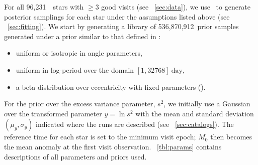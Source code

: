 \documentclass[modern, letterpaper]{aastex62}
\newcommand{\apogee}{\project{\acronym{APOGEE}}}
\newcommand{\thejoker}{\project{The~Joker}}
\newcommand{\nprior}{536,870,912}
\newcommand{\nstars}{96,231}
\begin{document}
For all \nstars\ \apogee\ stars with $\geq 3$ good visits (see
\sectionname~\ref{sec:data}), we use \thejoker\ to generate posterior samplings
for each star under the assumptions listed above (see
\sectionname~\ref{sec:fitting}).
We start by generating a library of \nprior\ prior samples generated under a
prior similar to that defined in \citet{Price-Whelan:2017}:
\begin{itemize}
    \item uniform or isotropic in angle parameters,
    \item uniform in log-period over the domain $[1,32768]~\textrm{day}$,
    \item a beta distribution over eccentricity with fixed parameters (\citealt{Kipping:2013}).
\end{itemize}
For the prior over the excess variance parameter, $s^2$, we initially use
a Gaussian over the transformed parameter $y = \ln s^2$ with the mean and
standard deviation $(\mu_y, \sigma_y)$ indicated where the runs are described
(see \sectionname~\ref{sec:catalogs}).
The reference time for each star is set to the minimum visit epoch; $M_0$ then
becomes the mean anomaly at the first visit observation.
\tablename~\ref{tbl:params} contains descriptions of all parameters and priors
used.
\end{document}
